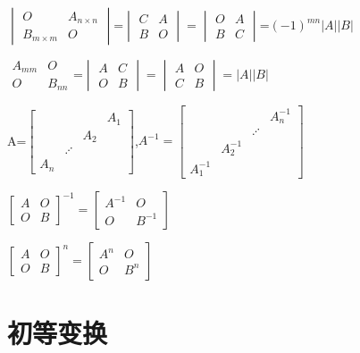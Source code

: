 \documentclass[UTF8]{ctexart}
\begin{document}
$\begin{vmatrix}O & A_{n\times n}\\
B_{m\times m} & O
\end{vmatrix}$=$\begin{vmatrix}C & A\\
B & O
\end{vmatrix}=\begin{vmatrix}O & A\\
B & C
\end{vmatrix}$=$(-1)^{mn}|A||B|$

$\begin{array}{|cc|}
A_{mm} & O\\
O & B_{nn}
\end{array}$=$\begin{vmatrix}A & C\\
O & B
\end{vmatrix}=\begin{vmatrix}A & O\\
C & B
\end{vmatrix}=|A||B|$

A=$\begin{bmatrix} &  &  & A_{1}\\
 &  & A_{2}\\
 & \iddots\\
A_{n}
\end{bmatrix}$,$A^{-1}=\begin{bmatrix} &  &  & A_{n}^{-1}\\
 &  & \iddots\\
 & A_{2}^{-1}\\
A_{1}^{-1}
\end{bmatrix}$

$\begin{bmatrix}A & O\\
O & B
\end{bmatrix}^{-1}=\begin{bmatrix}A^{-1} & O\\
O & B^{-1}
\end{bmatrix}$

$\begin{bmatrix}A & O\\
O & B
\end{bmatrix}^{n}=\begin{bmatrix}A^{n} & O\\
O & B^{n}
\end{bmatrix}$

\section{初等变换}
\end{document}
